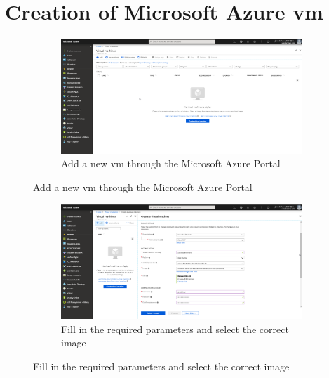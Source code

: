 \label{Containers_Azure}
\section{Creation of Microsoft Azure \acrshort{vm}}
\begin{figure}[h]
	\begin{subfigure}{\textwidth}
		\captionsetup{width=0.9\linewidth}
		\includegraphics[width=\linewidth]{img/Methodologie/Containers5.png} 
		\centering
		\caption{Add a new \acrshort{vm} through the Microsoft Azure Portal}
	\end{subfigure}
\end{figure}
\begin{figure}[h]\ContinuedFloat
	\begin{subfigure}{\textwidth}
		\captionsetup{width=0.9\linewidth}
		\includegraphics[width=\linewidth]{img/Methodologie/Containers6.png}
		\centering
		\caption{Fill in the required parameters and select the correct image}
	\end{subfigure}
\end{figure}
